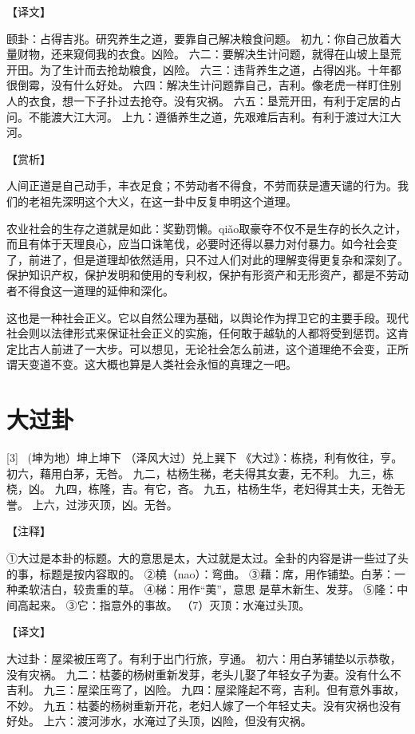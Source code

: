 \documentclass[12pt,UTF8]{ctexbook}
\begin{document}
【译文】

颐卦：占得吉兆。研究养生之道，要靠自己解决粮食问题。
初九：你自己放着大量财物，还来窥伺我的衣食。凶险。
六二：要解决生计问题，就得在山坡上垦荒开田。为了生计而去抢劫粮食，凶险。
六三：违背养生之道，占得凶兆。十年都很倒霉，没有什么好处。
六四：解决生计问题靠自己，吉利。像老虎一样盯住别人的衣食，想一下子扑过去抢夺。没有灾祸。
六五：垦荒开田，有利于定居的占问。不能渡大江大河。
上九：遵循养生之道，先艰难后吉利。有利于渡过大江大河。

【赏析】

人间正道是自己动手，丰衣足食；不劳动者不得食，不劳而获是遭天谴的行为。我们的老祖先深明这个大义，在这一卦中反复申明这个道理。

农业社会的生存之道就是如此：奖勤罚懒。qiǎo取豪夺不仅不是生存的长久之计，而且有体于天理良心，应当口诛笔伐，必要时还得以暴力对付暴力。如今社会变了，前进了，但是道理却依然适用，只不过人们对此的理解变得更复杂和深刻了。保护知识产权，保护发明和使用的专利权，保护有形资产和无形资产，都是不劳动者不得食这一道理的延伸和深化。

这也是一种社会正义。它以自然公理为基础，以舆论作为捍卫它的主要手段。现代社会则以法律形式来保证社会正义的实施，任何敢于越轨的人都将受到惩罚。这肯定比古人前进了一大步。可以想见，无论社会怎么前进，这个道理绝不会变，正所谓天变道不变。这大概也算是人类社会永恒的真理之一吧。

\chapter{大过卦}
[3] \ (坤为地）坤上坤下
（泽风大过）兑上巽下
《大过》：栋挠，利有攸往，亨。
初六，藉用白茅，无咎。
九二，枯杨生稊，老夫得其女妻，无不利。
九三，栋桡，凶。
九四，栋隆，吉。有它，吝。
九五，枯杨生华，老妇得其士夫，无咎无誉。
上六，过涉灭顶，凶。无咎。

【注释】

①大过是本卦的标题。大的意思是太，大过就是太过。全卦的内容是讲一些过了头的事，标题是按内容取的。
②橈（nao）：弯曲。
③藉：席，用作铺垫。白茅：一种柔软洁白，较贵重的草。
④梯：用作“荑”，意思 是草木新生、发芽。
⑤隆：中间高起来。
③它：指意外的事故。
（7）灭顶：水淹过头顶。

【译文】

大过卦：屋梁被压弯了。有利于出门行旅，亨通。
初六：用白茅铺垫以示恭敬，没有灾祸。
九二：枯萎的杨树重新发芽，老头儿娶了年轻女子为妻。没有什么不吉利。
九三：屋梁压弯了，凶险。
九四：屋梁隆起不弯，吉利。但有意外事故，不妙。
九五：枯萎的杨树重新开花，老妇人嫁了一个年轻丈夫。没有灾祸也没有好处。
上六：渡河涉水，水淹过了头顶，凶险，但没有灾祸。
\end{document}
